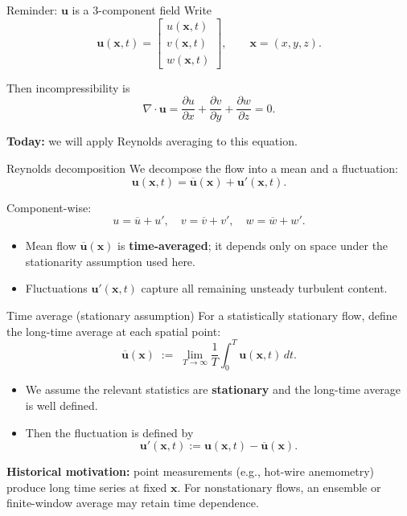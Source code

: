 \documentclass[aspectratio=169,11pt]{beamer}
\newcommand{\uu}{\bm{u}}
\newcommand{\x}{\bm{x}}
\newcommand{\avg}[1]{\overline{#1}}
\renewcommand{\up}{\uu'} %
\newcommand{\ubar}{\avg{\uu}}
\begin{document}
\begin{frame}{Reminder: $\uu$ is a 3-component field}
Write
\[
\uu(\x,t) =
\begin{bmatrix}
u(\x,t)\\
v(\x,t)\\
w(\x,t)
\end{bmatrix},
\qquad
\x=(x,y,z).
\]

Then incompressibility is
\[
\nabla\cdot\uu = \frac{\partial u}{\partial x} + \frac{\partial v}{\partial y} + \frac{\partial w}{\partial z} = 0.
\]

\textbf{Today:} we will apply Reynolds averaging to this equation.
\end{frame}

\begin{frame}{Reynolds decomposition}
We decompose the flow into a mean and a fluctuation:
\[
\uu(\x,t) = \ubar(\x) + \up(\x,t).
\]

Component-wise:
\[
u = \avg{u} + u',\quad
v = \avg{v} + v',\quad
w = \avg{w} + w'.
\]

\begin{itemize}
  \item Mean flow $\ubar(\x)$ is \textbf{time-averaged}; it depends only on space under the stationarity assumption used here.
  \item Fluctuations $\up(\x,t)$ capture all remaining unsteady turbulent content.
\end{itemize}

\end{frame}

\begin{frame}{Time average (stationary assumption)}
For a statistically stationary flow, define the long-time average at each spatial point:
\[
\avg{\uu}(\x) \;:=\; \lim_{T\to\infty}\frac{1}{T}\int_0^T \uu(\x,t)\,dt.
\]

\begin{itemize}
  \item We assume the relevant statistics are \textbf{stationary} and the long-time average is well defined.
  \item Then the fluctuation is defined by
  \[
  \up(\x,t) := \uu(\x,t) - \ubar(\x).
  \]
\end{itemize}

\textbf{Historical motivation:} point measurements (e.g., hot-wire anemometry) produce long time series at fixed $\x$. For nonstationary flows, an ensemble or finite-window average may retain time dependence.

\end{frame}
\end{document}
